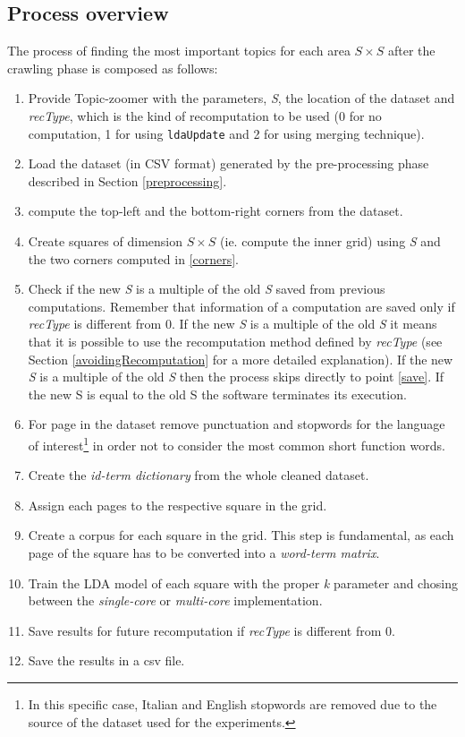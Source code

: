\documentclass{sig-alternate-05-2015}
\begin{document}
\subsection{Process overview}
\label{overview}
The process of finding the most important topics for each area $S \times S$ after the crawling phase is composed as follows:
\begin{enumerate}
    \item \label{params} Provide Topic-zoomer with the parameters, \emph{S}, the location of the dataset and \emph{recType}, which is the kind of recomputation to be used (0 for no computation, 1 for using \texttt{ldaUpdate} and 2 for using merging technique).
    \item \label{load} Load the dataset (in CSV format) generated by the pre-processing phase described in Section \ref{preprocessing}.
	\item \label{corners} compute the top-left and the bottom-right corners from the dataset.
        \item \label{init} Create squares of dimension $S \times S$ (ie. compute the inner grid) using \emph{S} and the two corners computed in \ref{corners}.
    \item \label{checkS} Check if the new \emph{S} is a multiple of the old \emph{S} saved from previous computations. Remember that information of a computation are saved only if \emph{recType} is different from 0. If the new \emph{S} is a multiple of the old \emph{S} it means that it is possible to use the recomputation method defined by \emph{recType} (see Section \ref{avoidingRecomputation} for a more detailed explanation). If the new \emph{S} is a multiple of the old \emph{S} then the process skips directly to point \ref{save}. If the new S is equal to the old S the software terminates its execution.
    \item \label{remove} For page in the dataset remove punctuation and stopwords\cite{mmd} for the language of interest\footnote{In this specific case, Italian and English stopwords are removed due to the source of the dataset used for the experiments.} in order not to consider the most common short function words.
    \item \label{dictDataset} Create the \textit{id-term dictionary} from the whole cleaned dataset.
	\item \label{assign} Assign each pages to the respective square in the grid.
    \item \label{convert} Create a corpus for each square in the grid. This step is fundamental, as each page of the square has to be converted into  a \textit{word-term matrix}.
    \item \label{train} Train the LDA model of each square with the proper \emph{k} parameter and chosing between the \emph{single-core} or \emph{multi-core} implementation.
    \item \label{partial} Save results for future recomputation if \emph{recType} is different from 0.
    \item \label{save} Save the results in a csv file.
\end{enumerate}
\end{document}
